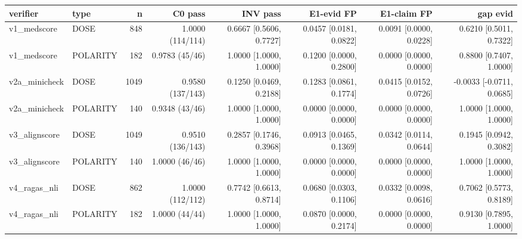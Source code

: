 \begin{tabular}{llrrrrrr}
\hline
verifier & type & n & C0 pass & INV pass & E1-evid FP & E1-claim FP & gap evid \\
\hline
v1_medscore & DOSE & 848 & 1.0000 (114/114) & 0.6667 [0.5606, 0.7727] & 0.0457 [0.0181, 0.0822] & 0.0091 [0.0000, 0.0228] & 0.6210 [0.5011, 0.7322] \\
v1_medscore & POLARITY & 182 & 0.9783 (45/46) & 1.0000 [1.0000, 1.0000] & 0.1200 [0.0000, 0.2800] & 0.0000 [0.0000, 0.0000] & 0.8800 [0.7407, 1.0000] \\
v2a_minicheck & DOSE & 1049 & 0.9580 (137/143) & 0.1250 [0.0469, 0.2188] & 0.1283 [0.0861, 0.1774] & 0.0415 [0.0152, 0.0726] & -0.0033 [-0.0711, 0.0685] \\
v2a_minicheck & POLARITY & 140 & 0.9348 (43/46) & 1.0000 [1.0000, 1.0000] & 0.0000 [0.0000, 0.0000] & 0.0000 [0.0000, 0.0000] & 1.0000 [1.0000, 1.0000] \\
v3_alignscore & DOSE & 1049 & 0.9510 (136/143) & 0.2857 [0.1746, 0.3968] & 0.0913 [0.0465, 0.1369] & 0.0342 [0.0114, 0.0644] & 0.1945 [0.0942, 0.3082] \\
v3_alignscore & POLARITY & 140 & 1.0000 (46/46) & 1.0000 [1.0000, 1.0000] & 0.0000 [0.0000, 0.0000] & 0.0000 [0.0000, 0.0000] & 1.0000 [1.0000, 1.0000] \\
v4_ragas_nli & DOSE & 862 & 1.0000 (112/112) & 0.7742 [0.6613, 0.8714] & 0.0680 [0.0303, 0.1106] & 0.0332 [0.0098, 0.0616] & 0.7062 [0.5773, 0.8189] \\
v4_ragas_nli & POLARITY & 182 & 1.0000 (44/44) & 1.0000 [1.0000, 1.0000] & 0.0870 [0.0000, 0.2174] & 0.0000 [0.0000, 0.0000] & 0.9130 [0.7895, 1.0000] \\
\hline
\end{tabular}
